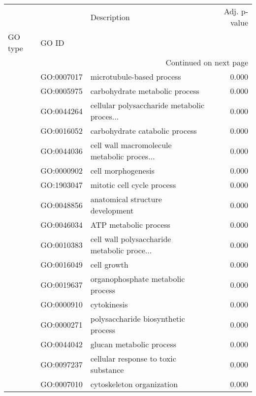 \begin{longtable}{lllr}
\toprule
   &            &                                  Description &  Adj. p-value \\
GO type & GO ID &                                              &               \\
\midrule
\endhead
\midrule
\multicolumn{4}{r}{{Continued on next page}} \\
\midrule
\endfoot

\bottomrule
\endlastfoot
\multirow{276}{*}{BP} & GO:0007017 &                    microtubule-based process &         0.000 \\
   & GO:0005975 &               carbohydrate metabolic process &         0.000 \\
   & GO:0044264 &  cellular polysaccharide metabolic proces... &         0.000 \\
   & GO:0016052 &               carbohydrate catabolic process &         0.000 \\
   & GO:0044036 &  cell wall macromolecule metabolic proces... &         0.000 \\
   & GO:0000902 &                           cell morphogenesis &         0.000 \\
   & GO:1903047 &                   mitotic cell cycle process &         0.000 \\
   & GO:0048856 &             anatomical structure development &         0.000 \\
   & GO:0046034 &                        ATP metabolic process &         0.000 \\
   & GO:0010383 &  cell wall polysaccharide metabolic proce... &         0.000 \\
   & GO:0016049 &                                  cell growth &         0.000 \\
   & GO:0019637 &            organophosphate metabolic process &         0.000 \\
   & GO:0000910 &                                  cytokinesis &         0.000 \\
   & GO:0000271 &          polysaccharide biosynthetic process &         0.000 \\
   & GO:0044042 &                     glucan metabolic process &         0.000 \\
   & GO:0097237 &         cellular response to toxic substance &         0.000 \\
   & GO:0007010 &                    cytoskeleton organization &         0.000 \\

\end{longtable}
